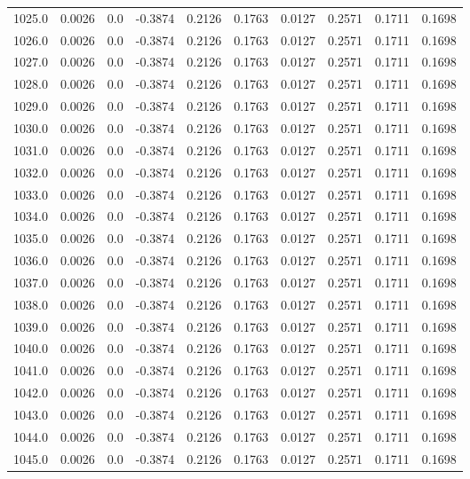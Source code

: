\begin{longtable}{lrrrrrrrrr}
1025.0 & 0.0026 & 0.0 & -0.3874 & 0.2126 & 0.1763 & 0.0127 & 0.2571 & 0.1711 & 0.1698 \\
1026.0 & 0.0026 & 0.0 & -0.3874 & 0.2126 & 0.1763 & 0.0127 & 0.2571 & 0.1711 & 0.1698 \\
1027.0 & 0.0026 & 0.0 & -0.3874 & 0.2126 & 0.1763 & 0.0127 & 0.2571 & 0.1711 & 0.1698 \\
1028.0 & 0.0026 & 0.0 & -0.3874 & 0.2126 & 0.1763 & 0.0127 & 0.2571 & 0.1711 & 0.1698 \\
1029.0 & 0.0026 & 0.0 & -0.3874 & 0.2126 & 0.1763 & 0.0127 & 0.2571 & 0.1711 & 0.1698 \\
1030.0 & 0.0026 & 0.0 & -0.3874 & 0.2126 & 0.1763 & 0.0127 & 0.2571 & 0.1711 & 0.1698 \\
1031.0 & 0.0026 & 0.0 & -0.3874 & 0.2126 & 0.1763 & 0.0127 & 0.2571 & 0.1711 & 0.1698 \\
1032.0 & 0.0026 & 0.0 & -0.3874 & 0.2126 & 0.1763 & 0.0127 & 0.2571 & 0.1711 & 0.1698 \\
1033.0 & 0.0026 & 0.0 & -0.3874 & 0.2126 & 0.1763 & 0.0127 & 0.2571 & 0.1711 & 0.1698 \\
1034.0 & 0.0026 & 0.0 & -0.3874 & 0.2126 & 0.1763 & 0.0127 & 0.2571 & 0.1711 & 0.1698 \\
1035.0 & 0.0026 & 0.0 & -0.3874 & 0.2126 & 0.1763 & 0.0127 & 0.2571 & 0.1711 & 0.1698 \\
1036.0 & 0.0026 & 0.0 & -0.3874 & 0.2126 & 0.1763 & 0.0127 & 0.2571 & 0.1711 & 0.1698 \\
1037.0 & 0.0026 & 0.0 & -0.3874 & 0.2126 & 0.1763 & 0.0127 & 0.2571 & 0.1711 & 0.1698 \\
1038.0 & 0.0026 & 0.0 & -0.3874 & 0.2126 & 0.1763 & 0.0127 & 0.2571 & 0.1711 & 0.1698 \\
1039.0 & 0.0026 & 0.0 & -0.3874 & 0.2126 & 0.1763 & 0.0127 & 0.2571 & 0.1711 & 0.1698 \\
1040.0 & 0.0026 & 0.0 & -0.3874 & 0.2126 & 0.1763 & 0.0127 & 0.2571 & 0.1711 & 0.1698 \\
1041.0 & 0.0026 & 0.0 & -0.3874 & 0.2126 & 0.1763 & 0.0127 & 0.2571 & 0.1711 & 0.1698 \\
1042.0 & 0.0026 & 0.0 & -0.3874 & 0.2126 & 0.1763 & 0.0127 & 0.2571 & 0.1711 & 0.1698 \\
1043.0 & 0.0026 & 0.0 & -0.3874 & 0.2126 & 0.1763 & 0.0127 & 0.2571 & 0.1711 & 0.1698 \\
1044.0 & 0.0026 & 0.0 & -0.3874 & 0.2126 & 0.1763 & 0.0127 & 0.2571 & 0.1711 & 0.1698 \\
1045.0 & 0.0026 & 0.0 & -0.3874 & 0.2126 & 0.1763 & 0.0127 & 0.2571 & 0.1711 & 0.1698 \\

\end{longtable}
